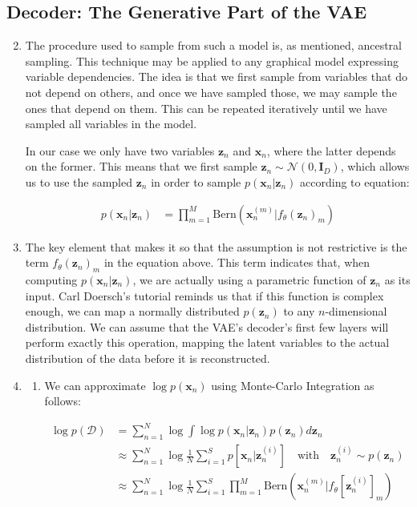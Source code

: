 \documentclass{article}
\begin{document}
\subsection{Decoder: The Generative Part of the VAE}

\begin{enumerate}[label=\textbf{1.\arabic*}]
  \setcounter{enumi}{1}
  \item
  The procedure used to sample from such a model is, as mentioned, ancestral sampling. This technique may be applied to any graphical model expressing variable dependencies. The idea is that we first sample from variables that do not depend on others, and once we have sampled those, we may sample the ones that depend on them. This can be repeated iteratively until we have sampled all variables in the model.

  In our case we only have two variables $\bm{z}_n$ and $\bm{x}_n$, where the latter depends on the former. This means that we first sample $\bm{z}_n \sim \mathcal{N}(0, \bm{I}_D)$, which allows us to use the sampled $\bm{z}_n$ in order to sample $p(\bm{x}_n | \bm{z}_n)$ according to equation:

  \begin{align*}
    p(\bm{x}_n | \bm{z}_n) &= \prod_{m=1}^M \text{Bern} \left( \bm{x}_n^{(m)} | f_{\theta} (\bm{z}_n)_m \right)
  \end{align*}

  \item
  The key element that makes it so that the assumption is not restrictive is the term $f_{\theta} (\bm{z}_n)_m$ in the equation above. This term indicates that, when computing $p(\bm{x}_n | \bm{z}_n)$, we are actually using a parametric function of $\bm{z}_n$ as its input. Carl Doersch's tutorial reminds us that if this function is complex enough, we can map a normally distributed $p(\bm{z}_n)$ to any $n$-dimensional distribution. We can assume that the VAE's decoder's first few layers will perform exactly this operation, mapping the latent variables to the actual distribution of the data before it is reconstructed.

  \item

  \begin{enumerate}[label=(\alph*)]
    \item
    We can approximate $\log p(\bm{x}_n)$ using Monte-Carlo Integration as follows:

    \begin{align*}
      \log p(\mathcal{D}) &= \sum_{n=1}^{N} \log \int \log p(\bm{x}_n | \bm{z}_n) p(\bm{z}_n) d \bm{z}_n \\
      &\approx \sum_{n=1}^{N} \log \frac{1}{N} \sum_{i=1}^{S} p\left[\bm{x}_n | \bm{z}_n^{(i)}\right] \quad \text{with} \quad \bm{z}_n^{(i)} \sim p(\bm{z}_n) \\
      &\approx \sum_{n=1}^{N} \log \frac{1}{N} \sum_{i=1}^{S} \prod_{m=1}^M \text{Bern} \left( \bm{x}_n^{(m)} | f_{\theta} \left[ \bm{z}_n^{(i)} \right]_m \right)
    \end{align*}


\end{enumerate}
\end{enumerate}
\end{document}
